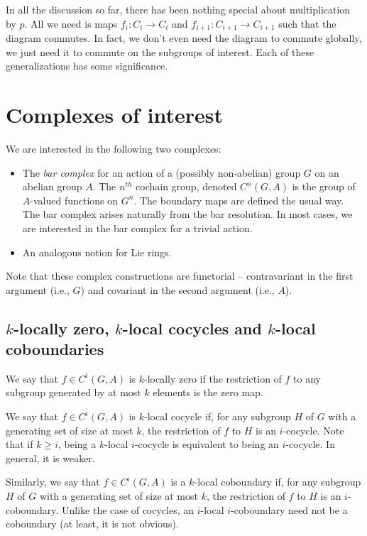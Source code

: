 \documentclass[10pt]{amsart}
\begin{document}
In all the discussion so far, there has been nothing special about
multiplication by $p$. All we need is maps $f_i:C_i \to C_i$ and
$f_{i+1}:C_{i+1} \to C_{i+1}$ such that the diagram commutes. In fact,
we don't even need the diagram to commute globally, we just need it to
commute on the subgroups of interest. Each of these generalizations
has some significance.

\section{Complexes of interest}

We are interested in the following two complexes:

\begin{itemize}
\item The {\em bar complex} for an action of a (possibly non-abelian)
  group $G$ on an abelian group $A$. The $n^{th}$ cochain group,
  denoted $C^n(G,A)$ is the group of $A$-valued functions on
  $G^n$. The boundary maps are defined the usual way. The bar complex
  arises naturally from the bar resolution. In most cases, we are
  interested in the bar complex for a trivial action.
\item An analogous notion for Lie rings.
\end{itemize}

Note that these complex constructions are functorial -- contravariant
in the first argument (i.e., $G$) and covariant in the second argument
(i.e., $A$).

\subsection{$k$-locally zero, $k$-local cocycles and $k$-local coboundaries}

We say that $f \in C^i(G,A)$ is $k$-locally zero if the restriction of
$f$ to any subgroup generated by at most $k$ elements is the zero map.

We say that $f \in C^i(G,A)$ is $k$-local cocycle if, for any subgroup
$H$ of $G$ with a generating set of size at most $k$, the restriction
of $f$ to $H$ is an $i$-cocycle. Note that if $k \ge i$, being a
$k$-local $i$-cocycle is equivalent to being an $i$-cocycle. In
general, it is weaker.

Similarly, we say that $f \in C^i(G,A)$ is a $k$-local coboundary if,
for any subgroup $H$ of $G$ with a generating set of size at most $k$,
the restriction of $f$ to $H$ is an $i$-coboundary. Unlike the case of
cocycles, an $i$-local $i$-coboundary need not be a coboundary (at
least, it is not obvious).
\end{document}
